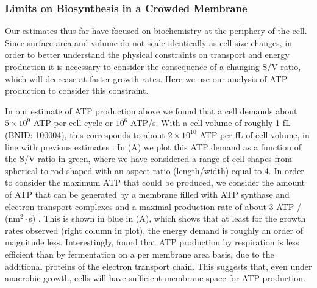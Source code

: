 \subsubsection{Limits on Biosynthesis in a Crowded Membrane}
Our estimates thus far have focused on biochemistry at the periphery of the cell.
Since surface area and volume do not scale identically as cell size changes,  in
order to better understand the physical constraints on transport and  energy
production it is necessary to consider the consequence of a changing S/V
ratio, which will decrease at faster growth rates. Here we use our analysis of
ATP production  to consider this constraint.

In our estimate of ATP production above we found that a cell demands about $5
\times 10^9$ ATP per cell cycle or $10^6$ ATP/s. With a cell volume of roughly 1
fL (BNID: 100004), this corresponds to about $2 \times 10^{10}$ ATP per fL of cell volume, in
line with previous estimates \citep{stouthamer1977, szenk2017}. In
 (A) we plot this ATP demand as a function of the S/V ratio
in green, where we have considered a range of cell shapes from spherical to
rod-shaped with an aspect ratio (length/width) equal to 4. In order to consider
the maximum ATP that could be produced, we consider the amount of ATP that can
be generated by a membrane filled with ATP synthase and electron transport
complexes and a maximal production rate of about 3 ATP / (nm$^2 \cdot$s)
\citep{szenk2017}. This is shown in blue in (A), which shows
that at least for the growth rates observed (right column in plot), the energy
demand is roughly an order of magnitude less. Interestingly, \cite{szenk2017}
found that ATP production by respiration is less efficient than by
fermentation on a per membrane area basis, due to the additional proteins of the
electron transport chain. This suggests that, even under anaerobic growth, cells
will have sufficient membrane space for ATP production.

